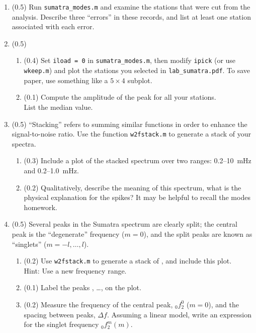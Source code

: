 \documentclass[11pt,titlepage,fleqn]{article}
\begin{document}
\begin{enumerate}

\item (0.5) Run \verb+sumatra_modes.m+ and examine the stations that were cut from the analysis. Describe three ``errors'' in these records, and list at least one station associated with each error.


\item (0.5)
%
\begin{enumerate}
\item (0.4) Set \verb+iload = 0+ in \verb+sumatra_modes.m+, then modify \verb+ipick+ (or use \verb+wkeep.m+) and plot the stations you selected in \verb+lab_sumatra.pdf+. To save paper, use something like a $5 \times 4$ subplot.

\item (0.1) Compute the amplitude of the  peak for all your stations. \\
List the median value.
\end{enumerate}


\item (0.5) ``Stacking'' refers to summing similar functions in order to enhance the signal-to-noise ratio. Use the function \verb+w2fstack.m+ to generate a stack of your spectra.
%
\begin{enumerate}
\item (0.3) Include a plot of the stacked spectrum over two ranges: 0.2--10~mHz and 0.2--1.0~mHz.
\item (0.2) Qualitatively, describe the meaning of this spectrum, \eg what is the physical explanation for the spikes? It may be helpful to recall the modes homework.
\end{enumerate}
%


\item (0.5) Several peaks in the Sumatra spectrum are clearly split; the central peak is the ``degenerate'' frequency ($m=0$), and the split peaks are known as ``singlets'' ($m = -l,\ldots,l$). 
%
\begin{enumerate}
\item (0.2) Use \verb+w2fstack.m+ to generate a stack of , and include this plot. \\
Hint: Use a new frequency range.
\item (0.1) Label the peaks , \ldots,  on the plot.
\item (0.2) Measure the frequency of the central peak, $_0f_2^0$ ($m=0$), and the spacing between peaks, $\Delta f$.
Assuming a linear model, write an expression for the singlet frequency $_0f_2^m(m)$.
\end{enumerate}


\end{enumerate}
\end{document}
